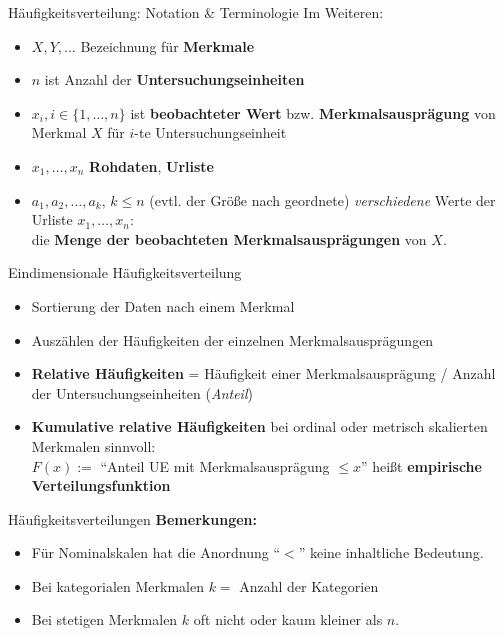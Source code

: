 \documentclass[
  10pt,
  ignorenonframetext,
]{beamer}
\providecommand{\tightlist}{%
  \setlength{\itemsep}{0pt}\setlength{\parskip}{0pt}}
\begin{document}
\begin{frame}{Häufigkeitsverteilung: Notation \& Terminologie}
\protect\hypertarget{huxe4ufigkeitsverteilung-notation-terminologie}{}
Im Weiteren:

\begin{itemize}
\tightlist
\item
  \(X, Y, \ldots\) Bezeichnung für \textbf{Merkmale}
\item
  \(n\) ist Anzahl der \textbf{Untersuchungseinheiten}
\item
  \(x_i, i \in \{1, \ldots, n\}\) ist \textbf{beobachteter Wert} bzw.
  \textbf{Merkmalsausprägung} von Merkmal \(X\) für \(i\)-te
  Untersuchungseinheit
\item
  \(x_1, \ldots, x_n\) \textbf{Rohdaten}, \textbf{Urliste}
\item
  \(a_1, a_2, \ldots, a_k, \, k \le n\) (evtl. der Größe nach geordnete)
  \emph{verschiedene} Werte der Urliste \(x_1,\ldots,x_n\):\\
  die \textbf{Menge der beobachteten Merkmalsausprägungen} von \(X\).
\end{itemize}
\end{frame}

\begin{frame}{Eindimensionale Häufigkeitsverteilung}
\protect\hypertarget{eindimensionale-huxe4ufigkeitsverteilung}{}
\begin{itemize}
\tightlist
\item
  Sortierung der Daten nach einem Merkmal
\item
  Auszählen der Häufigkeiten der einzelnen Merkmalsausprägungen
\item
  \textbf{Relative Häufigkeiten} = Häufigkeit einer Merkmalsausprägung /
  Anzahl der Untersuchungseinheiten (\emph{Anteil})
\item
  \textbf{Kumulative relative Häufigkeiten} bei ordinal oder metrisch
  skalierten Merkmalen sinnvoll:\\
  \(F(x):=\) ``Anteil UE mit Merkmalsausprägung \(\leq x\)'' heißt
  \textbf{empirische Verteilungsfunktion}
\end{itemize}
\end{frame}

\begin{frame}{Häufigkeitsverteilungen}
\protect\hypertarget{huxe4ufigkeitsverteilungen}{}
\textbf{Bemerkungen:}

\begin{itemize}
\tightlist
\item
  Für Nominalskalen hat die Anordnung ``\(<\)'' keine inhaltliche
  Bedeutung.
\item
  Bei kategorialen Merkmalen \(k =\) Anzahl der Kategorien
\item
  Bei stetigen Merkmalen \(k\) oft nicht oder kaum kleiner als \(n\).
\end{itemize}
\end{frame}
\end{document}
